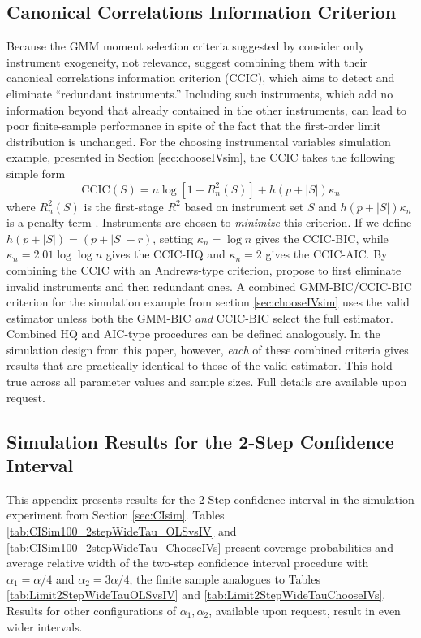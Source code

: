 \subsection{Canonical Correlations Information Criterion}
\label{sec:CCIC}
Because the GMM moment selection criteria suggested by \cite{Andrews1999} consider only instrument exogeneity, not relevance, \cite{HallPeixe2003} suggest combining them with their canonical correlations information criterion (CCIC), which aims to detect and eliminate ``redundant instruments.''
Including such instruments, which add no information beyond that already contained in the other instruments, can lead to poor finite-sample performance in spite of the fact that the first-order limit distribution is unchanged.
For the choosing instrumental variables simulation example, presented in Section \ref{sec:chooseIVsim}, the CCIC takes the following simple form
	\begin{equation}
	\mbox{CCIC}(S) = n \log\left[1 - R_n^2(S) \right] + h(p + |S|)\kappa_n
	\end{equation}
where $R_n^2(S)$ is the first-stage $R^2$ based on instrument set $S$ and $h(p + |S|)\kappa_n$ is a penalty term \citep{Jana2005}. 
Instruments are chosen to \emph{minimize} this criterion.
If we define $h(p + |S|) = (p + |S| - r)$, setting $\kappa_n = \log{n}$ gives the CCIC-BIC, while $\kappa_n = 2.01 \log{\log{n}}$ gives the CCIC-HQ and $\kappa_n = 2$ gives the CCIC-AIC.
By combining the CCIC with an Andrews-type criterion, \cite{HallPeixe2003} propose to first eliminate invalid instruments and then redundant ones.
A combined GMM-BIC/CCIC-BIC criterion for the simulation example from section \ref{sec:chooseIVsim} uses the valid estimator unless both the GMM-BIC \emph{and} CCIC-BIC select the full estimator.
Combined HQ and AIC-type procedures can be defined analogously.
In the simulation design from this paper, however, \emph{each} of these combined criteria gives results that are practically identical to those of the valid estimator.
This hold true across all parameter values and sample sizes.
Full details are available upon request.

\subsection{Simulation Results for the 2-Step Confidence Interval}
\label{append:conf_sim}

This appendix presents results for the 2-Step confidence interval in the simulation experiment from Section \ref{sec:CIsim}.
Tables \ref{tab:CISim100_2stepWideTau_OLSvsIV} and \ref{tab:CISim100_2stepWideTau_ChooseIVs} 
present coverage probabilities and average relative width of the two-step confidence interval procedure with $\alpha_1 = \alpha/4$ and $\alpha_2 = 3\alpha/4$, the finite sample analogues to Tables \ref{tab:Limit2StepWideTauOLSvsIV} and \ref{tab:Limit2StepWideTauChooseIVs}. 
Results for other configurations of $\alpha_1, \alpha_2$, available upon request, result in even wider intervals.

